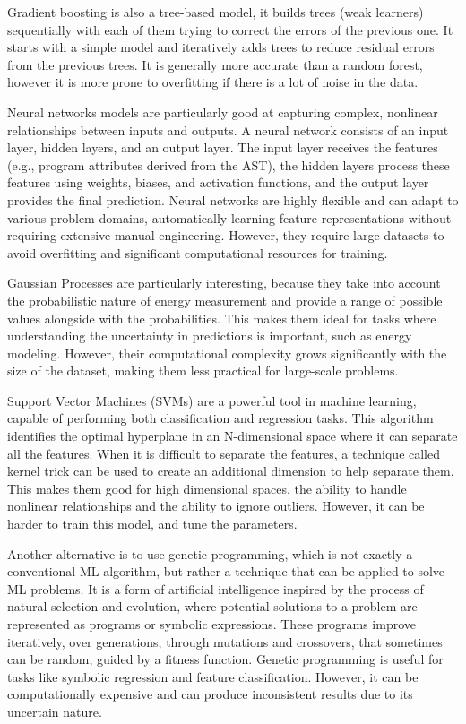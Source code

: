Gradient boosting is also a tree-based model, it builds trees (weak learners) sequentially with each of them trying to correct the errors of the previous one. It starts with a simple model and iteratively adds trees to reduce residual errors from the previous trees. It is generally more accurate than a random forest, however it is more prone to overfitting if there is a lot of noise in the data.

Neural networks models are particularly good at capturing complex, nonlinear relationships between inputs and outputs. A neural network consists of an input layer, hidden layers, and an output layer. The input layer receives the features (e.g., program attributes derived from the AST), the hidden layers process these features using weights, biases, and activation functions, and the output layer provides the final prediction. Neural networks are highly flexible and can adapt to various problem domains, automatically learning feature representations without requiring extensive manual engineering. However, they require large datasets to avoid overfitting and significant computational resources for training.

Gaussian Processes are particularly interesting, because they take into account the probabilistic nature of energy measurement and provide a range of possible values alongside with the probabilities. This makes them ideal for tasks where understanding the uncertainty in predictions is important, such as energy modeling. However, their computational complexity grows significantly with the size of the dataset, making them less practical for large-scale problems.

Support Vector Machines (SVMs) are a powerful tool in machine learning, capable of performing both classification and regression tasks. This algorithm identifies the optimal hyperplane in an N-dimensional space where it can separate all the features. When it is difficult to separate the features, a technique called kernel trick can be used to create an additional dimension to help separate them. This makes them good for high dimensional spaces, the ability to handle nonlinear relationships and the ability to ignore outliers. However, it can be harder to train this model, and tune the parameters.

Another alternative is to use genetic programming, which is not exactly a conventional ML algorithm, but rather a technique that can be applied to solve ML problems. It is a form of artificial intelligence inspired by the process of natural selection and evolution, where potential solutions to a problem are represented as programs or symbolic expressions. These programs improve iteratively, over generations, through mutations and crossovers, that sometimes can be random, guided by a fitness function. Genetic programming is useful for tasks like symbolic regression and feature classification. However, it can be computationally expensive and can produce inconsistent results due to its uncertain nature.

